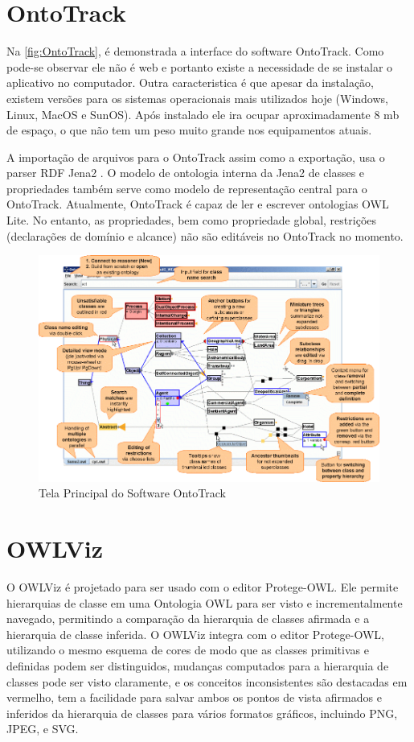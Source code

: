 \section{OntoTrack}

Na \autoref{fig:OntoTrack}, é demonstrada a interface do software OntoTrack. Como pode-se observar ele não é web e portanto existe a necessidade de se instalar o aplicativo no computador. Outra caracteristica é que apesar da instalação, existem versões para os sistemas operacionais mais utilizados hoje (Windows, Linux, MacOS e SunOS). Após instalado ele ira ocupar aproximadamente 8 mb de espaço, o que não tem um peso muito grande nos equipamentos atuais.

A importação de arquivos para o OntoTrack assim como a exportação, usa o parser RDF Jena2 \cite{McBride2001}. O modelo de ontologia interna da Jena2 de classes e propriedades também serve como modelo de representação central para o OntoTrack. Atualmente, OntoTrack é capaz de ler e escrever ontologias OWL Lite. No entanto, as propriedades, bem como propriedade global, restrições (declarações de domínio e alcance) não são editáveis no OntoTrack no momento.

\begin{figure}[h]
    \centering
    \includegraphics[width=12cm]{OnTrack.png}
    \caption{Tela Principal do Software OntoTrack}
    \label{fig:OntoTrack}
\end{figure}


\section{OWLViz}

O OWLViz é projetado para ser usado com o editor Protege-OWL. Ele permite hierarquias de classe em uma Ontologia OWL para ser visto e incrementalmente navegado, permitindo a comparação da hierarquia de classes afirmada e a hierarquia de classe inferida. O OWLViz integra com o editor Protege-OWL, utilizando o mesmo esquema de cores de modo que as classes primitivas e definidas podem ser distinguidos, mudanças computados para a hierarquia de classes pode ser visto claramente, e os conceitos inconsistentes são destacadas em vermelho, tem a facilidade para salvar ambos os pontos de vista afirmados e inferidos da hierarquia de classes para vários formatos gráficos, incluindo PNG, JPEG, e SVG.

